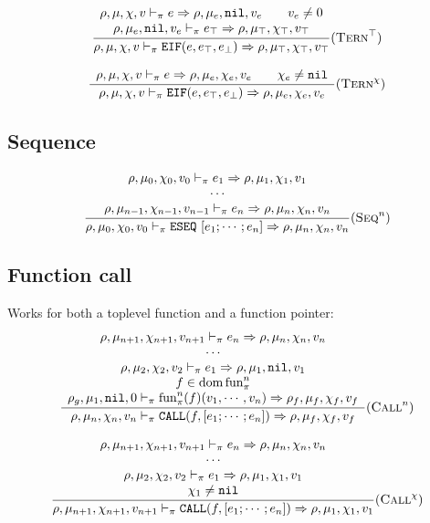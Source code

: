 \[\dfrac{\begin{array}{c}
    \rho,\mu,\chi,v \vdash_\pi e\Rightarrow \rho,\mu_e,\texttt{nil},v_e \qquad v_e \ne 0\\
    \rho,\mu_e,\texttt{nil},v_e \vdash_\pi e_\top \Rightarrow \rho,\mu_\top,\chi_\top,v_\top \\
\end{array}}{\rho,\mu,\chi,v \vdash_\pi \texttt{EIF}(e, e_\top, e_\bot) \Rightarrow \rho,\mu_\top,\chi_\top,v_\top}(\textsc{Tern}^\top)\]

\[\dfrac{\begin{array}{c}
    \rho,\mu,\chi,v \vdash_\pi e\Rightarrow \rho,\mu_e,\chi_e,v_e \qquad \chi_e\ne\texttt{nil}
\end{array}}{\rho,\mu,\chi,v \vdash_\pi \texttt{EIF}(e, e_\top, e_\bot) \Rightarrow \rho,\mu_e,\chi_e,v_e}(\textsc{Tern}^\chi)\]


\subsection{Sequence}
\[\dfrac{\begin{array}{c}
    \rho,\mu_0,\chi_0,v_0 \vdash_\pi e_1 \Rightarrow \rho,\mu_1,\chi_1,v_1 \\
    \cdots \\
    \rho,\mu_{n-1},\chi_{n-1},v_{n-1} \vdash_\pi e_n \Rightarrow \rho,\mu_n,\chi_n,v_n \\
\end{array}}{\rho,\mu_0,\chi_0,v_0 \vdash_\pi \texttt{ESEQ}\ [e_1;\cdots;e_n] \Rightarrow \rho,\mu_n,\chi_n,v_n} (\textsc{Seq}^n)\]

\subsection{Function call}
Works for both a toplevel function and a function pointer:
\[\dfrac{\begin{array}{c}
    \rho,\mu_{n+1},\chi_{n+1},v_{n+1} \vdash_\pi e_n \Rightarrow \rho,\mu_n,\chi_n,v_n \\
    \cdots \\
    \rho,\mu_2,\chi_2,v_2 \vdash_\pi e_1 \Rightarrow \rho,\mu_1,\texttt{nil},v_1 \\
    f\in\operatorname{dom}\text{fun}_\pi^n \\
    \rho_g,\mu_1,\texttt{nil},0 \vdash_\pi \text{fun}_\pi^n(f)(v_1, \cdots, v_n) \Rightarrow \rho_f,\mu_f,\chi_f,v_f
\end{array}}{\rho,\mu_n,\chi_n,v_n \vdash_\pi \texttt{CALL}(f, [e_1; \cdots; e_n]) \Rightarrow \rho,\mu_f,\chi_f,v_f} (\textsc{Call}^n)\]

\[\dfrac{\begin{array}{c}
    \rho,\mu_{n+1},\chi_{n+1},v_{n+1} \vdash_\pi e_n \Rightarrow \rho,\mu_n,\chi_n,v_n \\
    \cdots \\
    \rho,\mu_2,\chi_2,v_2 \vdash_\pi e_1 \Rightarrow \rho,\mu_1,\chi_1,v_1 \\
    \chi_1\ne\texttt{nil} \\
\end{array}}{\rho,\mu_{n+1},\chi_{n+1},v_{n+1} \vdash_\pi \texttt{CALL}(f, [e_1; \cdots; e_n]) \Rightarrow \rho,\mu_1,\chi_1,v_1} (\textsc{Call}^\chi)\]



